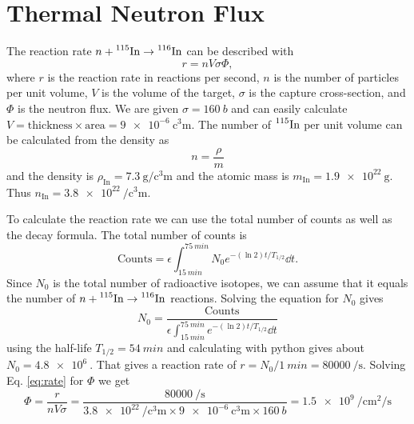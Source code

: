 \section{Thermal Neutron Flux}
The reaction rate $n + \nuc{In}{115} \to \nuc{In}{116}$ can be described with
\begin{equation}
	r = n V \sigma \Phi,\label{eq:rate}
\end{equation}
where $r$ is the reaction rate in reactions per second, $n$ is the number of particles per unit volume, $V$ is the volume of the target, $\sigma$ is the capture cross-section, and $\Phi$ is the neutron flux.
We are given $\sigma = \SI{160}{b}$ and can easily calculate $V = \text{thickness} \times \text{area} = \SI{9e-6}{\cubic\centi\m}$. The number of $\nuc{In}{115}$ per unit volume can be calculated from the density as 
\begin{equation}
	n = \frac{\rho}{m}
\end{equation}
and the density is $\rho_\mathrm{In} = \SI{7.3}{\gram\per\cubic\centi\meter}$ and the atomic mass is $m_\mathrm{In} = \SI{1.9e22}{\gram}$. Thus $n_\mathrm{In} = \SI{3.8e22}{\per\cubic\centi\m}$.

To calculate the reaction rate we can use the total number of counts as well as the decay formula. The total number of counts is 
\begin{equation}
	\text{Counts} = \epsilon \int_{\SI{15}{min}}^{\SI{75}{min}} N_0 e^{-(\ln 2) t / T_{1/2}} \dd t.
\end{equation}
Since $N_0$ is the total number of radioactive isotopes, we can assume that it equals the number of $n + \nuc{In}{115} \to \nuc{In}{116}$ reactions. Solving the equation for $N_0$ gives 
\begin{equation}
	N_0 = \frac{\text{Counts}}{\epsilon \int_{\SI{15}{min}}^{\SI{75}{min}} e^{-(\ln 2) t / T_{1/2}} \dd t}
\end{equation}
using the half-life $T_{1/2} = \SI{54}{min}$ and calculating with python gives about $N_0 = \SI{4.8e6}{}$. That gives a reaction rate of $r = N_0 / \SI{1}{min} = \SI{80000}{\per\s}$. Solving Eq. \eqref{eq:rate} for $\Phi$ we get
\begin{equation}
	\Phi = \frac{r}{n V \sigma} = \frac{\SI{80000}{\per\s}}{\SI{3.8e22}{\per\cubic\centi\m} \times \SI{9e-6}{\cubic\centi\m} \times \SI{160}{b}} = \SI{1.5e9}{\per\centi\m\squared\per\s}
\end{equation}